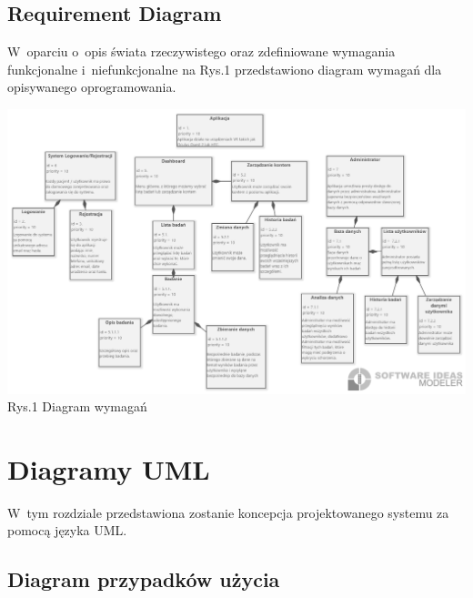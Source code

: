 \documentclass[12pt, letterpaper]{article}
\begin{document}
			
		\subsection{Requirement Diagram}
		
		W~oparciu o~opis świata rzeczywistego oraz zdefiniowane wymagania funkcjonalne i~niefunkcjonalne na Rys.1 przedstawiono diagram wymagań dla opisywanego oprogramowania.
		
		\begin{center}
			\includegraphics[scale=0.4]{reqDiagram}\\
			\caption{Rys.1 Diagram wymagań}
		\end{center}
		
		
		\section{Diagramy UML}

		W~tym rozdziale przedstawiona zostanie koncepcja projektowanego systemu za pomocą języka UML.		
		
		\subsection{Diagram przypadków użycia}
		
\end{document}
